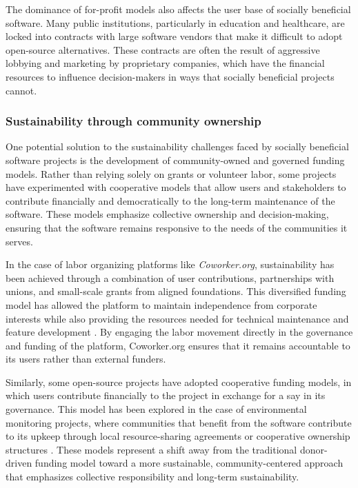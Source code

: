 \begin{refsection}
The dominance of for-profit models also affects the user base of socially beneficial software. Many public institutions, particularly in education and healthcare, are locked into contracts with large software vendors that make it difficult to adopt open-source alternatives. These contracts are often the result of aggressive lobbying and marketing by proprietary companies, which have the financial resources to influence decision-makers in ways that socially beneficial projects cannot.

\subsubsection{Sustainability through community ownership}

One potential solution to the sustainability challenges faced by socially beneficial software projects is the development of community-owned and governed funding models. Rather than relying solely on grants or volunteer labor, some projects have experimented with cooperative models that allow users and stakeholders to contribute financially and democratically to the long-term maintenance of the software. These models emphasize collective ownership and decision-making, ensuring that the software remains responsive to the needs of the communities it serves.

In the case of labor organizing platforms like \textit{Coworker.org}, sustainability has been achieved through a combination of user contributions, partnerships with unions, and small-scale grants from aligned foundations. This diversified funding model has allowed the platform to maintain independence from corporate interests while also providing the resources needed for technical maintenance and feature development \cite[pp.~120-123]{mcalevey2021}. By engaging the labor movement directly in the governance and funding of the platform, Coworker.org ensures that it remains accountable to its users rather than external funders.

Similarly, some open-source projects have adopted cooperative funding models, in which users contribute financially to the project in exchange for a say in its governance. This model has been explored in the case of environmental monitoring projects, where communities that benefit from the software contribute to its upkeep through local resource-sharing agreements or cooperative ownership structures \cite[pp.~70-73]{foster2000}. These models represent a shift away from the traditional donor-driven funding model toward a more sustainable, community-centered approach that emphasizes collective responsibility and long-term sustainability.


\end{refsection}
